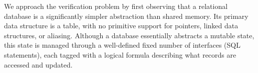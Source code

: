 


We approach the verification problem by first observing that a
relational database is a significantly simpler abstraction than shared
memory. Its primary data structure is a table, with no primitive
support for pointers, linked data structures, or aliasing.  Although a
database essentially abstracts a mutable state, this state is managed
through a well-defined fixed number of interfaces (SQL statements),
each tagged with a logical formula describing what records are
accessed and updated.

